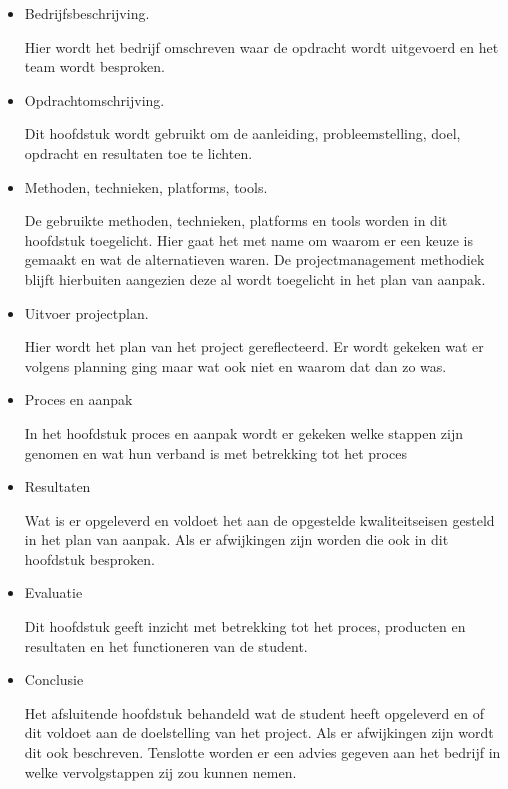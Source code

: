 \documentclass[a4paper, 11pt, oneside]{report}
\begin{document}
\begin{itemize}
	\item Bedrijfsbeschrijving.
	
	Hier wordt het bedrijf omschreven waar de opdracht wordt uitgevoerd en het team wordt besproken.
	\item Opdrachtomschrijving.
	
	Dit hoofdstuk wordt gebruikt om de aanleiding, probleemstelling, doel, opdracht en resultaten toe te lichten.
	
	\item Methoden, technieken, platforms, tools.
	
	De gebruikte methoden, technieken, platforms en tools worden in dit hoofdstuk toegelicht. Hier gaat het met name om waarom er een keuze is gemaakt en wat de alternatieven waren. De projectmanagement methodiek blijft hierbuiten aangezien deze al wordt toegelicht in het plan van aanpak.
	
	\item Uitvoer projectplan.
	
	Hier wordt het plan van het project gereflecteerd. Er wordt gekeken wat er volgens planning ging maar wat ook niet en waarom dat dan zo was.
	
	\item Proces en aanpak
	
	In het hoofdstuk proces en aanpak wordt er gekeken welke stappen zijn genomen en wat hun verband is met betrekking tot het proces
	
	\item Resultaten
	
	Wat is er opgeleverd en voldoet het aan de opgestelde kwaliteitseisen gesteld in het plan van aanpak. Als er afwijkingen zijn worden die ook in dit hoofdstuk besproken.
	
	\item Evaluatie 
	
	Dit hoofdstuk geeft inzicht met betrekking tot het proces, producten en resultaten en het functioneren van de student.
	
	\item Conclusie
	
	Het afsluitende hoofdstuk behandeld wat de student heeft opgeleverd en of dit voldoet aan de doelstelling van het project.
	Als er afwijkingen zijn wordt dit ook beschreven.
	Tenslotte worden er een advies gegeven aan het bedrijf in welke vervolgstappen zij zou kunnen nemen.
	
\end{itemize}
\end{document}

